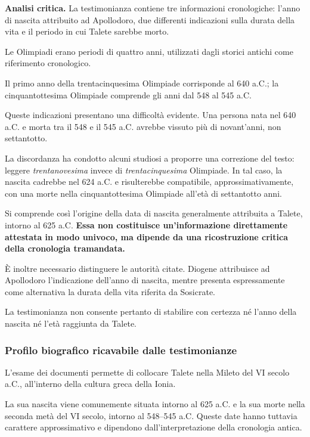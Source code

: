 
\noindent\textbf{Analisi critica.}
La testimonianza contiene tre informazioni cronologiche: l'anno di nascita attribuito ad Apollodoro, due differenti indicazioni sulla durata della vita e il periodo in cui Talete sarebbe morto.

Le Olimpiadi erano periodi di quattro anni, utilizzati dagli storici antichi come riferimento cronologico.

Il primo anno della trentacinquesima Olimpiade corrisponde al 640 a.C.; la cinquantottesima Olimpiade comprende gli anni dal 548 al 545 a.C.

Queste indicazioni presentano una difficoltà evidente. Una persona nata nel 640 a.C. e morta tra il 548 e il 545 a.C. avrebbe vissuto più di novant'anni, non settantotto.

La discordanza ha condotto alcuni studiosi a proporre una correzione del testo: leggere \emph{trentanovesima} invece di \emph{trentacinquesima} Olimpiade. In tal caso, la nascita cadrebbe nel 624 a.C. e risulterebbe compatibile, approssimativamente, con una morte nella cinquantottesima Olimpiade all'età di settantotto anni.

Si comprende così l'origine della data di nascita generalmente attribuita a Talete, intorno al 625 a.C. \textbf{Essa non costituisce un'informazione direttamente attestata in modo univoco, ma dipende da una ricostruzione critica della cronologia tramandata.}

È inoltre necessario distinguere le autorità citate. Diogene attribuisce ad Apollodoro l'indicazione dell'anno di nascita, mentre presenta espressamente come alternativa la durata della vita riferita da Sosicrate.

La testimonianza non consente pertanto di stabilire con certezza né l'anno della nascita né l'età raggiunta da Talete.

\subsubsection{Profilo biografico ricavabile dalle testimonianze}

L'esame dei documenti permette di collocare Talete nella Mileto del VI secolo a.C., all'interno della cultura greca della Ionia.

La sua nascita viene comunemente situata intorno al 625 a.C. e la sua morte nella seconda metà del VI secolo, intorno al 548--545 a.C. Queste date hanno tuttavia carattere approssimativo e dipendono dall'interpretazione della cronologia antica.

